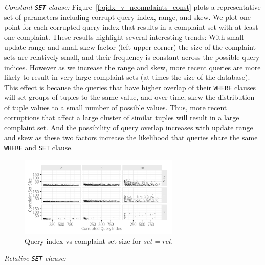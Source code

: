 \smallskip
\emph{Constant \texttt{SET} clause: } Figure~\ref{f:qidx_v_ncomplaints_const} plots a representative set of parameters including corrupt query index, range, and skew. We plot one point
for each corrupted query index that results in a complaint set with at least one complaint. 
These results highlight several interesting trends:  With small update range and small skew factor (left upper corner)
the size of the complaint sets are relatively small, and their frequency is constant across the possible query indices.
However as we increase the range and skew, more recent queries are more likely to result in very large complaint sets (at times the size of the database).   
This effect is because the queries that have higher overlap of their \texttt{WHERE} clauses will set groups of tuples to the same value,
and over time, skew the distribution of tuple values to a small number of possible values. 
Thus, more recent corruptions that affect a large cluster of similar tuples will result in a large complaint set.
And the possibility of query overlap increases with update range and skew as these two factors increase the likelihood that queries share the same \texttt{WHERE} and \texttt{SET} clause. 



\begin{figure}[t]
\centering
\includegraphics[width = 3in]{figures/qidxsimulation/qidx_v_ncomplaints_20attrs_rel}
\caption{Query index vs complaint set size for $set = rel$.}
\label{f:qidx_v_ncomplaints_rel} 
\end{figure}

\smallskip
\emph{Relative \texttt{SET} clause: } 

\fi

